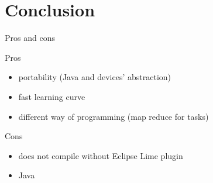 \documentclass[10pt, compress]{beamer}
\begin{document}
\section{Conclusion}

\begin{frame}{Pros and cons}
    \begin{exampleblock}{Pros}
    \begin{itemize}
    \item portability (Java and devices' abstraction)
    \item fast learning curve
    \item different way of programming (map reduce for tasks)
    \end{itemize}
    \end{exampleblock}
    \begin{alertblock}{Cons}
    \begin{itemize}
    \item does not compile without Eclipse Lime plugin
    \item Java
    \end{itemize}
    \end{alertblock}
\end{frame}


\end{document}
